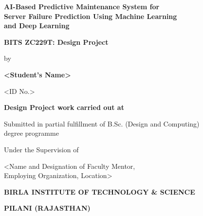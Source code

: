 \documentclass[12pt,letterpaper]{report}
\begin{document}
\begin{titlepage}
\centering
\vspace*{0.5in}

{\Large\bfseries AI-Based Predictive Maintenance System for\\[6pt]
Server Failure Prediction Using Machine Learning\\[6pt]
and Deep Learning}

\vspace{0.4in}

{\large\bfseries BITS ZC229T: Design Project}

\vspace{0.3in}

{\large by}

\vspace{0.2in}

{\large\bfseries <Student's Name>}

{\large <ID No.>}

\vspace{0.3in}

{\large\bfseries Design Project work carried out at}

\vspace{0.1in}

{\large\bfseries <Name of the Employing Organization, Location>}

\vspace{0.3in}

{\normalsize Submitted in partial fulfillment of B.Sc. (Design and Computing)\\
degree programme}

\vspace{0.2in}

{\normalsize Under the Supervision of}

\vspace{0.1in}

{\normalsize <Name and Designation of Faculty Mentor,\\
Employing Organization, Location>}

\vspace{0.4in}

\fbox{\begin{minipage}{1.07in}
  \centering
  \vspace{0.4in}
  {\scriptsize BITS LOGO}
  \vspace{0.4in}
\end{minipage}}

\vspace{0.4in}

{\large\bfseries BIRLA INSTITUTE OF TECHNOLOGY \& SCIENCE}

{\large\bfseries PILANI (RAJASTHAN)}

\vspace{0.3in}

{}

\end{titlepage}
\end{document}
